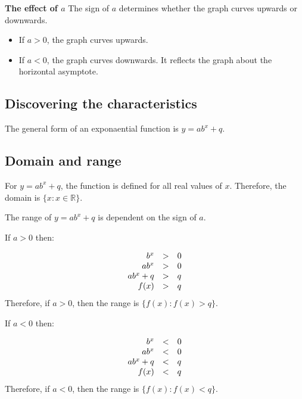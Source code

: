 \textbf{The effect of $a$}\newline
The sign of $a$ determines whether the graph curves upwards or downwards. 
\begin{itemize}
 \item If $a>0$, the graph curves upwards.
\item If $a<0$, the graph curves downwards. It reflects the graph about the horizontal asymptote.
\end{itemize}

\subsection*{Discovering the characteristics}
The general form of an exponaential function is $y=ab^{x} + q$.
\subsection*{Domain and range}

For $y=ab^{x}+q$, the function is defined for all real values of $x$. Therefore, the domain is $\{x:x\in \mathbb{R}\}$.\par 
The range of $y=ab^{x}+q$ is dependent on the sign of $a$.\par 
If $a>0$ then:\par
\begin{equation*}
\begin{array}{ccc}\hfill b^{x}& > & 0\hfill \\
 \hfill ab^{x}& > & 0\hfill \\ 
\hfill ab^{x}+q& > & q\hfill \\ 
\hfill f(x)& > & q\hfill 
\end{array}
\end{equation*}
Therefore, if $a>0$, then the range is $\{f(x):f(x) > q\}$.\par 
If $a<0$ then:\par 

\begin{equation*}
\begin{array}{ccc}\hfill b^{x}&< & 0\hfill \\
 \hfill ab^{x}& < & 0\hfill \\
\hfill ab^{x}+q& < & q\hfill \\
 \hfill f(x)& < & q\hfill 
\end{array}
\end{equation*}
Therefore, if $a<0$, then the range is $\{f(x):f(x) < q\}$.\par 

